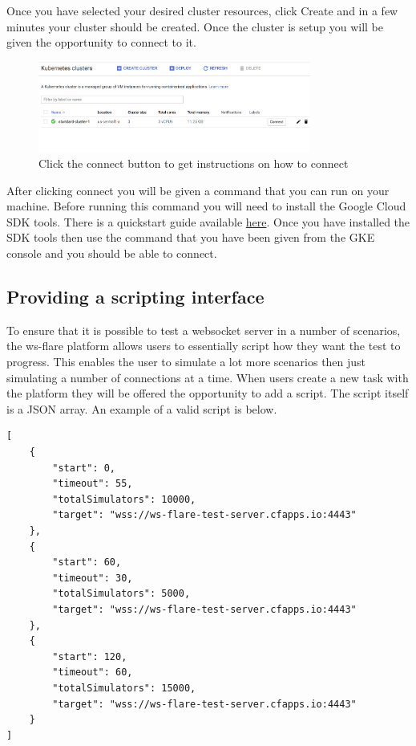 \FloatBarrier

Once you have selected your desired cluster resources, click Create and in a few minutes your cluster should be created. Once the cluster is setup you will be given the opportunity to connect to it. 

\begin{figure}[!h]
  \centering
    \includegraphics[width=0.8\textwidth]{figures/gke-setup-3.png}
    \caption{Click the connect button to get instructions on how to connect}
    \label{fig:https-handshake}
\end{figure}

\FloatBarrier

After clicking connect you will be given a command that you can run on your machine. Before running this command you will need to install the Google Cloud SDK tools. There is a quickstart guide available
\href{https://cloud.google.com/sdk/docs/quickstart-linux}{here}. Once you have installed the SDK tools then use the command that you have been given from the GKE console and you should be able to connect.

\subsection{Providing a scripting interface}

To ensure that it is possible to test a websocket server in a number of scenarios, the ws-flare platform allows users to essentially script how they want the test to progress. This enables the user to simulate a lot more scenarios then just simulating a number of connections at a time. When users create a new task with the platform they will be offered the opportunity to add a script. The script itself is a JSON array. An example of a valid script is below.

\begin{verbatim}
[
    {
        "start": 0,
        "timeout": 55,
        "totalSimulators": 10000,
        "target": "wss://ws-flare-test-server.cfapps.io:4443"
    },
    {
        "start": 60,
        "timeout": 30,
        "totalSimulators": 5000,
        "target": "wss://ws-flare-test-server.cfapps.io:4443"
    },
    {
        "start": 120,
        "timeout": 60,
        "totalSimulators": 15000,
        "target": "wss://ws-flare-test-server.cfapps.io:4443"
    }
]
\end{verbatim}

